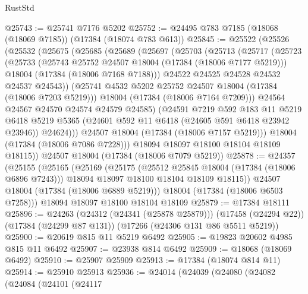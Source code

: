 \begin{lexlean}{RustStd}
\begin{coremodule}
@25743 := @25741 @7176 @5202
@25752 := @24495 @783 @7185 (@18068 (@18069 @7185)) (@17384 (@18074 @783 @613))
@25845 := @25522
    (@25526
      (@25532
        (@25675
          (@25685
            (@25689
              (@25697
                (@25703
                  (@25713
                    (@25717
                      (@25723
                        (@25733
                          (@25743 @25752 @24507 @18004 (@17384 (@18006 @7177 @5219)))
                          @18004
                          (@17384 (@18006 @7168 @7188)))
                        @24522
                        @24525
                        @24528
                        @24532
                        @24537
                        @24543))
                    (@25741 @4532 @5202 @25752 @24507 @18004 (@17384 (@18006 @7203 @5219)))
                    @18004
                    (@17384 (@18006 @7164 @7209)))
                  @24564
                  @24567
                  @24570
                  @24574
                  @24579
                  @24585)
                (@24591
                  @7219
                  @592
                  @183
                  @11
                  @5219
                  @6418
                  @5219
                  @5365
                  (@24601 @592 @11 @6418 (@24605 @591 @6418 @23942 @23946))
                  @24624)))
            @24507
            @18004
            (@17384 (@18006 @7157 @5219)))
          @18004
          (@17384 (@18006 @7086 @7228)))
        @18094
        @18097
        @18100
        @18104
        @18109
        @18115))
    @24507
    @18004
    (@17384 (@18006 @7079 @5219))
@25878 := @24357
    (@25155
      (@25165
        (@25169
          (@25175
            (@25512 @25845 @18004 (@17384 (@18006 @6896 @7243)))
            @18094
            @18097
            @18100
            @18104
            @18109
            @18115))
        @24507
        @18004
        (@17384 (@18006 @6889 @5219)))
      @18004
      (@17384 (@18006 @6503 @7258)))
    @18094
    @18097
    @18100
    @18104
    @18109
@25879 := @17384 @18111
@25896 := @24263
    (@24312 (@24341 (@25878 @25879)))
    (@17458 (@24294 @22))
    (@17384 (@24299 @87 @131))
    (@17266 (@24306 @131 @86 @5511 @5219))
@25900 := @20619 @815 @11 @5219 @6492
@25905 := @19823 @20602 @4985 @815 @11 @6492
@25907 := @23938 @814 @6492
@25909 := @18068 (@18069 @6492)
@25910 := @25907 @25909
@25913 := @17384 (@18074 @814 @11)
@25914 := @25910 @25913
@25936 := @24014
    (@24039
      (@24080
        (@24082
          (@24084
            (@24101
              (@24117

\end{coremodule}
\end{lexlean}
